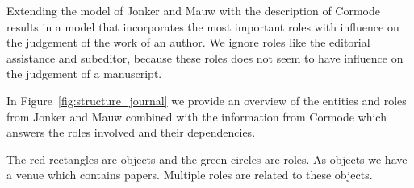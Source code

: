 \documentclass{ou-report}
\begin{document}
Extending the model of Jonker and Mauw with the description of Cormode
\cite{C2013} results
in a model that incorporates the most important roles with influence on the 
judgement of the work of an author. We 
ignore roles like the editorial assistance and subeditor, because these roles 
does not seem to have influence on the judgement of a manuscript. 

In 
Figure~\ref{fig:structure_journal} we provide an overview of the entities and 
roles from Jonker and Mauw combined with the information from Cormode which 
answers the roles involved and their dependencies.

The red rectangles are objects and the green circles are roles.
As objects we have a venue which contains papers. Multiple roles are related to
these objects.



            
            
\end{document}
